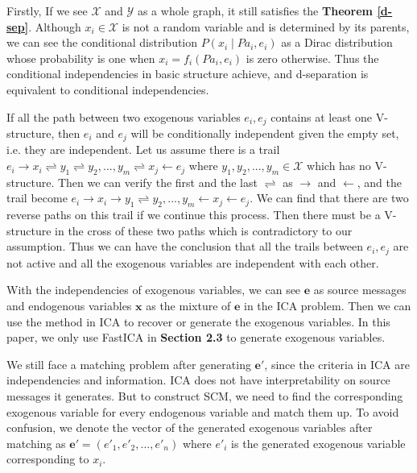 \documentclass[twoside,11pt]{article}
\begin{document}
Firstly, If we see $\mathcal X$ and $\mathcal Y$ as a whole graph, it still satisfies the \textbf{Theorem \ref{d-sep}}. Although $x_i\in\mathcal X$ is not a random variable and is determined by its parents, we can see the conditional distribution $P(x_i\mid Pa_i, e_i)$ as a Dirac distribution whose probability is one when $x_i=f_i(Pa_i, e_i)$ is zero otherwise. Thus the conditional independencies in basic structure achieve, and d-separation is equivalent to conditional independencies. 

If all the path between two exogenous variables $e_i, e_j$ contains at least one V-structure, then $e_i$ and $e_j$ will be conditionally independent given the empty set, i.e. they are independent. Let us assume there is a trail $e_i\to x_i\rightleftharpoons y_1\rightleftharpoons y_2, ..., y_m\rightleftharpoons x_j\gets e_j$ where $y_1, y_2, ..., y_m\in \mathcal X$ which has no V-structure. Then we can verify the first and the last $\rightleftharpoons$ as $\to$ and $\gets$, and the trail become $e_i\to x_i\to y_1\rightleftharpoons y_2, ..., y_m\gets x_j\gets e_j$. We can find that there are two reverse paths on this trail if we continue this process. Then there must be a V-structure in the cross of these two paths which is contradictory to our assumption. Thus we can have the conclusion that all the trails between $e_i, e_j$ are not active and all the exogenous variables are independent with each other.

With the independencies of exogenous variables, we can see $\mathbf e$ as source messages and endogenous variables $\mathbf x$ as the mixture of $\mathbf e$ in the ICA problem. Then we can use the method in ICA to recover or generate the exogenous variables. In this paper, we only use FastICA in \textbf{Section 2.3} to generate exogenous variables. 

We still face a matching problem after generating $\mathbf e'$, since the criteria in ICA are independencies and information. ICA does not have interpretability on source messages it generates. But to construct SCM, we need to find the corresponding exogenous variable for every endogenous variable and match them up. To avoid confusion, we denote the vector of the generated exogenous variables after matching as $\mathbf e'=(e'_1, e'_2, ..., e'_n)$ where $e'_i$ is the generated exogenous variable corresponding to $x_i$.

\end{document}
